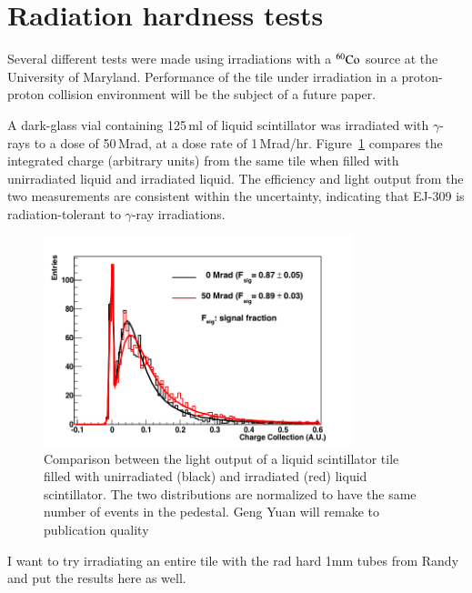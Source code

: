 \documentclass[review]{elsarticle}
\begin{document}
\section{Radiation hardness tests}

Several different tests were made using irradiations with a
$\rm{^{60}Co}$ source at the University of Maryland.
Performance of the tile under irradiation in a proton-proton collision
environment will be the subject of a future paper.

A dark-glass vial containing 125\,ml
of liquid scintillator was irradiated with $\gamma$-rays to a
dose of 50\,Mrad, at a dose rate of 1\,Mrad/hr.
Figure~\ref{fig:ej309_irradiated} compares the integrated charge (arbitrary units)
from the same tile when filled with unirradiated liquid and irradiated liquid.
The efficiency and light output from the two measurements are
consistent within the uncertainty, indicating that EJ-309 is
radiation-tolerant to $\gamma$-ray irradiations.

\begin{figure}[!ht]
\begin{center}
\includegraphics[width=0.8\textwidth]{./figures/RD_R7600_1_0_DBF_ALM_GRS_TH450_100814_all_1.png}
\caption{Comparison between the light output of a liquid scintillator
  tile filled with unirradiated (black) and irradiated (red) liquid
  scintillator. The two distributions are normalized to have the same
  number of events in the pedestal.{\color{red} Geng Yuan will remake to publication quality}}
\label{fig:ej309_irradiated}
\end{center}
\end{figure}

{\Large\color{red} I want to try irradiating an entire tile with the rad hard 1mm tubes from Randy and put the results here as well.}
\end{document}
